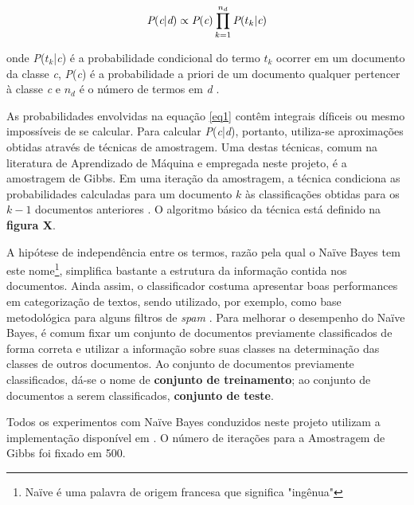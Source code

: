\begin{equation}
\label{eq1}
\emph{P}(\emph{c}|\emph{d}) \ensuremath{\propto} \emph{P}(\emph{c})\prod_{k=1}^{\ensuremath{n_d}}\emph{P}(\ensuremath{t_k}|\emph{c})  
\end{equation} 

onde \emph{P}(\ensuremath{t_k}|\emph{c}) é a probabilidade condicional do termo \ensuremath{t_k}  ocorrer em um documento da classe \emph{c},  \emph{P}(\emph{c}) é a probabilidade a priori de um documento qualquer pertencer à classe \emph{c} e \ensuremath{n_d} é o número de termos em \emph{d} \cite{stanford-IRbook}.

As probabilidades envolvidas na equação \ref{eq1} contêm integrais díficeis ou mesmo impossíveis de se calcular. Para calcular \emph{P}(\emph{c}|\emph{d}), portanto, utiliza-se aproximações obtidas através de técnicas de amostragem. Uma destas técnicas, comum na literatura de Aprendizado de Máquina e empregada neste projeto, é a amostragem de Gibbs. Em uma iteração da amostragem, a técnica condiciona as probabilidades calculadas para um documento \ensuremath{k} às classificações obtidas para os \ensuremath{k - 1} documentos anteriores \cite{resnik-gibbs}. O algoritmo básico da técnica está definido na \textbf{figura X}.


A hipótese de independência entre os termos, razão pela qual o Naïve Bayes tem este nome\footnote{Naïve é uma palavra de origem francesa que significa "ingênua"}, simplifica bastante a estrutura da informação contida nos documentos. Ainda assim, o classificador costuma apresentar boas performances em categorização de textos, sendo utilizado, por exemplo, como base metodológica para alguns filtros de \emph{spam} \cite{paul}. Para melhorar o desempenho do Naïve Bayes, é comum fixar um conjunto de documentos previamente classificados de forma correta e utilizar a informação sobre suas classes na determinação das classes de outros documentos. Ao conjunto de documentos previamente classificados, dá-se o nome de \textbf{conjunto de treinamento}; ao conjunto de documentos a serem classificados, \textbf{conjunto de teste}.

Todos os experimentos com Naïve Bayes conduzidos neste projeto utilizam a implementação disponível em \cite{alibezz-nb}. O número de iterações para a Amostragem de Gibbs foi fixado em 500. %
 
